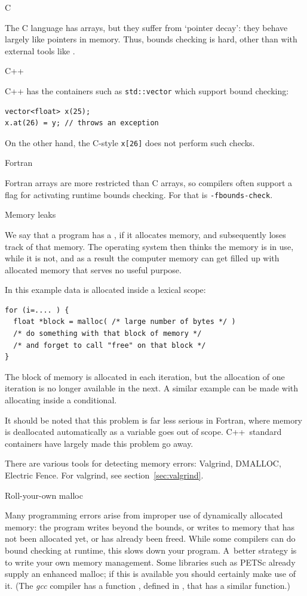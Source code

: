 {C}

The C language has arrays, but they suffer from `pointer decay':
they behave largely like pointers in memory. Thus, bounds checking
is hard, other than with external tools like .

 {C++}

C++ has the containers such as \lstinline{std::vector} which support bound checking:
\begin{lstlisting}
vector<float> x(25);
x.at(26) = y; // throws an exception
\end{lstlisting}
On the other hand, the C-style \lstinline{x[26]} does not perform such checks.

 {Fortran}

Fortran arrays are more restricted than C arrays, so compilers
often support a flag for activating runtime bounds checking.
For  that is \lstinline{-fbounds-check}.

 {Memory leaks}
\label{sec:memory-leak}

We say that a program has a , if it allocates
memory, and subsequently loses track of that memory. The operating
system then thinks the memory is in use, while it is not, and as a
result the computer memory can get filled up with allocated memory
that serves no useful purpose.

In this example data is allocated inside a lexical scope:
\begin{lstlisting}
for (i=.... ) {
  float *block = malloc( /* large number of bytes */ )
  /* do something with that block of memory */
  /* and forget to call "free" on that block */
}
\end{lstlisting}
The block of memory is allocated in each iteration, but the allocation
of one iteration is no longer available in the next. A similar example
can be made with allocating inside a conditional. 

  It should be noted
  that this problem is far less serious in Fortran, where memory is
  deallocated automatically as a variable goes out of scope.
C++~standard containers have largely made this problem go away.

There are various tools for detecting memory errors: Valgrind,
DMALLOC, Electric Fence. For valgrind, see section~\ref{sec:valgrind}.

 {Roll-your-own malloc}

Many programming errors arise from improper use of dynamically
allocated memory: the program writes beyond the bounds, or writes to
memory that has not been allocated yet, or has already been
freed. While some compilers can do bound checking at runtime, this
slows down your program. A~better strategy is to write your own memory
management. Some libraries such as PETSc already supply an enhanced
malloc; if this is available you should certainly make use of
it. (The \emph{gcc} compiler has a
function ,
defined in , that has a
similar function.)

